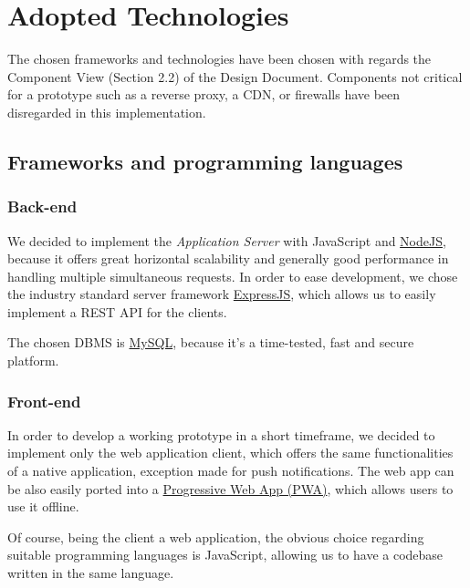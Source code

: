 \documentclass[
]{article}
\begin{document}
\hypertarget{adopted-technologies}{%
\section{Adopted Technologies}\label{adopted-technologies}}

The chosen frameworks and technologies have been chosen with regards the
Component View (Section 2.2) of the Design Document. Components not critical for a prototype such as a reverse proxy, a CDN, or firewalls have been disregarded in this implementation.

\hypertarget{frameworks-and-programming-languages}{%
\subsection{Frameworks and programming
languages}\label{frameworks-and-programming-languages}}

\hypertarget{back-end}{%
\subsubsection{Back-end}\label{back-end}}

We decided to implement the \emph{Application Server} with JavaScript
and \href{https://nodejs.org}{NodeJS}, because it offers great
horizontal scalability and generally good performance in handling
multiple simultaneous requests. In order to ease development, we chose
the industry standard server framework
\href{https://expressjs.com/}{ExpressJS}, which allows us to easily
implement a REST API for the clients.

The chosen DBMS is \href{https://www.mysql.com/}{MySQL}, because it's a
time-tested, fast and secure platform.

\hypertarget{front-end}{%
\subsubsection{Front-end}\label{front-end}}

In order to develop a working prototype in a short timeframe, we decided
to implement only the web application client, which offers the same
functionalities of a native application, exception made for push
notifications. The web app can be also easily ported into a
\href{https://developer.mozilla.org/en-US/docs/Web/Progressive_web_apps}{Progressive
Web App (PWA)}, which allows users to use it offline.

Of course, being the client a web application, the obvious choice
regarding suitable programming languages is JavaScript, allowing us to
have a codebase written in the same language.
\end{document}

